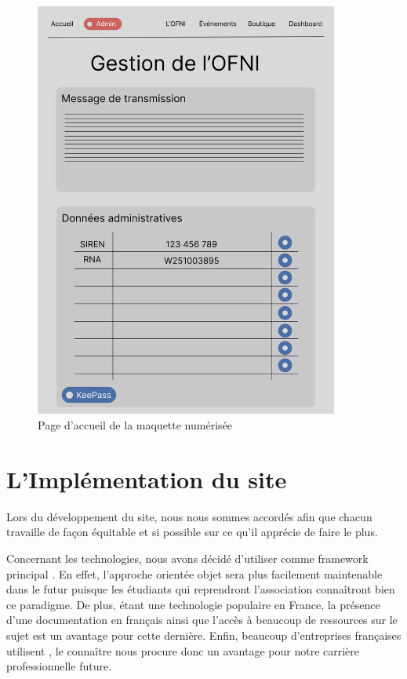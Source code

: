 \begin{figure}[H]
    \centering
    \includegraphics[width=10cm]{assets/pictures/figma.png}
    \caption{Page d'accueil de la maquette numérisée}
    \label{figma}
\end{figure}



\section{L'Implémentation du site}

Lors du développement du site, nous nous sommes accordés afin que chacun travaille de façon équitable et si possible sur ce qu'il apprécie de faire le plus.
\bigskip

Concernant les technologies, nous avons décidé d'utiliser comme framework principal . En effet, l'approche orientée objet sera plus facilement maintenable dans le futur puisque les étudiants qui reprendront l'association connaîtront bien ce paradigme. De plus, étant une technologie populaire en France, la présence d'une documentation en français ainsi que l'accès à beaucoup de ressources sur le sujet est un avantage pour cette dernière. Enfin, beaucoup d'entreprises françaises utilisent , le connaître nous procure donc un avantage pour notre carrière professionnelle future.
\bigskip

